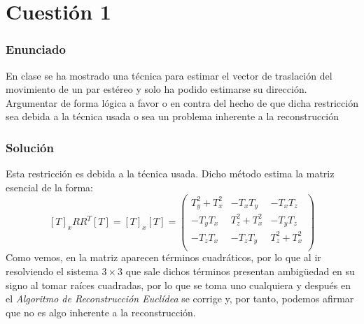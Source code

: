 \maketitle %

\newpage %

\tableofcontents %



\newpage




\section{Cuestión 1}

\subsubsection{Enunciado}

En clase se ha mostrado una técnica para estimar el vector de traslación del movimiento de un par estéreo y solo ha podido estimarse su dirección. Argumentar de forma lógica a favor o en contra del hecho de que dicha restricción sea debida a la técnica usada o sea un problema inherente a la reconstrucción

\subsubsection{Solución}

  Esta restricción es debida a la técnica usada. Dicho método estima la matriz
  esencial de la forma:
  \[ [T]_x R R^T [T] = [T]_x [T] = \left(
  \begin{array}{ccc}
  T_y^2 + T_x^2 & -T_xT_y & -T_xT_z \\
  -T_yT_x & T_z^2 + T_x^2 & -T_yT_z \\
  -T_zT_x & -T_zT_y & T_z^2 + T_x^2 \\
  \end{array}
  \right) \]
  Como vemos, en la matriz aparecen términos cuadráticos, por lo que al ir resolviendo el sistema $3\times3$ que sale dichos términos presentan ambigüedad en su signo al tomar raíces cuadradas, por lo que se toma uno cualquiera y después en el \textit{Algoritmo de Reconstrucción Euclídea} se corrige y, por tanto, podemos afirmar que no es algo inherente a la reconstrucción.

